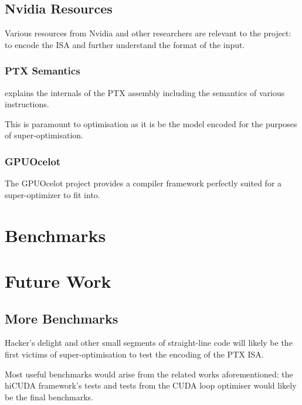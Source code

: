 \documentclass[letterpaper,twocolumn,10pt]{article}
\begin{document}
\subsection{Nvidia Resources}

Various resources from Nvidia and other researchers
are relevant to the project:
to encode the ISA and further understand the format
of the input.

\subsubsection{PTX Semantics}

\cite{PTXDoc} explains the internals of the PTX
assembly including the semantics of various
instructions.

This is paramount to optimisation as it is
be the model encoded for the purposes of
super-optimisation.

\subsubsection{GPUOcelot}

The GPUOcelot project \cite{GPUOcelot} provides
a compiler framework perfectly suited for a super-optimizer
to fit into.

\section{Benchmarks}



\section{Future Work}

\subsection{More Benchmarks}

Hacker's delight and other small segments of
straight-line code will likely be the first
victims of super-optimisation to test the
encoding of the PTX ISA.

Most useful benchmarks would arise from the related works aforementioned:
the hiCUDA \cite{hicuda} framework's tests and tests
from the CUDA loop optimiser \cite{CUDASynth} would likely
be the final benchmarks.
\end{document}
